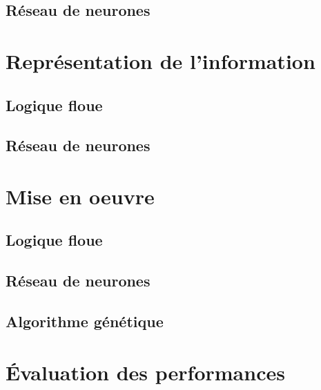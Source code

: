 \documentclass[12pt,letterpaper]{article}
\begin{document}
\subsection{Réseau de neurones} %

\section{Représentation de l'information}

\subsection{Logique floue}

\subsection{Réseau de neurones} %

\section{Mise en oeuvre}

\subsection{Logique floue}

\subsection{Réseau de neurones} %

\subsection{Algorithme génétique}

\section{Évaluation des performances}
\end{document}
